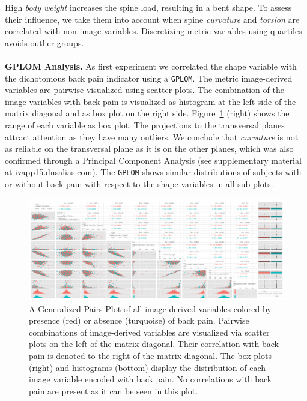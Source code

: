 \documentclass[a4paper,twoside]{style/article}
\begin{document}
High \emph{body weight} increases the spine load, resulting in a bent shape.
To assess their influence, we take them into account when spine \emph{curvature} and \emph{torsion} are correlated with non-image variables.
Discretizing metric variables using quartiles avoids outlier groups.
\\\\
\noindent \textbf{GPLOM Analysis.}
As first experiment we correlated the shape variable with the dichotomous back pain indicator using a \texttt{GPLOM}.
The metric image-derived variables are pairwise visualized using scatter plots.
The combination of the image variables with back pain is visualized as histogram at the left side of the matrix diagonal and as box plot on the right side.
Figure~\ref{fig:image-parameter-range} (right) shows the range of each variable as box plot.
The projections to the transversal planes attract attention as they have many outliers.
We conclude that \emph{curvature} is not as reliable on the transversal plane as it is on the other planes, which was also confirmed through a Principal Component Analysis (see supplementary material at \url{ivapp15.dnsalias.com}).
The \texttt{GPLOM} shows similar distributions of subjects with or without back pain with respect to the shape variables in all sub plots.
\begin{figure}[htb]
  \centering
  \includegraphics[width=1.0\textwidth]{figures/image-parameter-range}
  \caption{
A Generalized Pairs Plot of all image-derived variables colored by presence (red) or absence (turquoise) of back pain.
Pairwise combinations of image-derived variables are visualized via scatter plots on the left of the matrix diagonal.
Their correlation with back pain is denoted to the right of the matrix diagonal.
The box plots (right) and histograms (bottom) display the distribution of each image variable encoded with back pain.
No correlations with back pain are present as it can be seen in this plot.
}
  \label{fig:image-parameter-range}
\end{figure}
\end{document}
